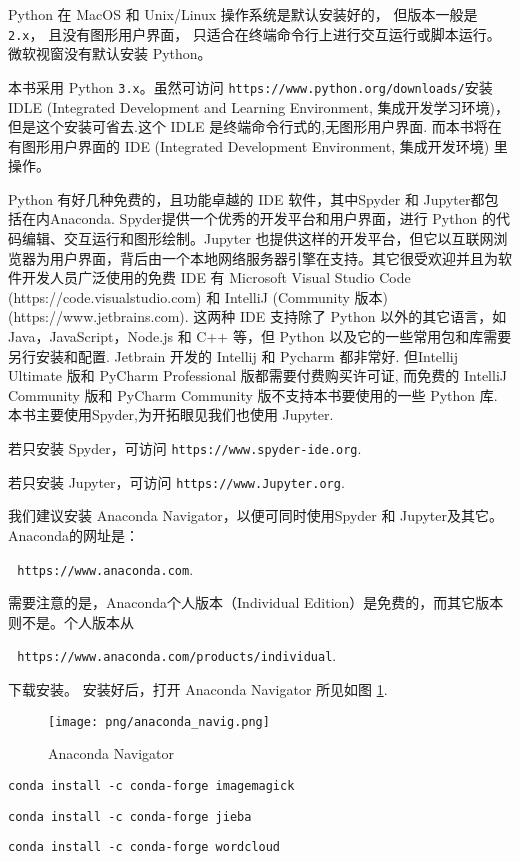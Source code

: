 \documentclass[main.tex]{subfiles}
\begin{document}
Python 在 MacOS 和 Unix/Linux 操作系统是默认安装好的，
但版本一般是 \texttt{2.x}，
且没有图形用户界面，
只适合在终端命令行上进行交互运行或脚本运行。
微软视窗没有默认安装 Python。

本书采用 Python \texttt{3.x}。虽然可访问 \texttt{https://www.python.org/downloads/}安装 IDLE (Integrated Development and Learning Environment, 集成开发学习环境)，但是这个安装可省去.这个 IDLE 是终端命令行式的,无图形用户界面.
而本书将在有图形用户界面的 IDE (Integrated Development Environment, 集成开发环境) 里操作。

Python 有好几种免费的，且功能卓越的 IDE 软件，其中Spyder 和 Jupyter都包括在内Anaconda. Spyder提供一个优秀的开发平台和用户界面，进行 Python 的代码编辑、交互运行和图形绘制。Jupyter 也提供这样的开发平台，但它以互联网浏览器为用户界面，背后由一个本地网络服务器引擎在支持。其它很受欢迎并且为软件开发人员广泛使用的免费 IDE 有 Microsoft Visual Studio Code (https://code.visualstudio.com) 和 IntelliJ (Community 版本)
 (https://www.jetbrains.com).
这两种 IDE 支持除了 Python 以外的其它语言，如 Java，JavaScript，Node.js 和 C++ 等，但 Python 以及它的一些常用包和库需要另行安装和配置. Jetbrain 开发的 Intellij 和 Pycharm 都非常好. 但Intellij Ultimate 版和 PyCharm Professional 版都需要付费购买许可证, 而免费的 IntelliJ Community 版和 PyCharm Community 版不支持本书要使用的一些 Python 库. 本书主要使用Spyder,为开拓眼见我们也使用 Jupyter.


若只安装 Spyder，可访问
\texttt{https://www.spyder-ide.org}.

若只安装 Jupyter，可访问
\texttt{https://www.Jupyter.org}.

我们建议安装 Anaconda Navigator，以便可同时使用Spyder 和 Jupyter及其它。 Anaconda的网址是：

\,\,\,\,\texttt{https://www.anaconda.com}.

\noindent 需要注意的是，Anaconda个人版本（Individual Edition）是免费的，而其它版本则不是。个人版本从

\,\,\,\,\texttt{https://www.anaconda.com/products/individual}.

\noindent 下载安装。
安装好后，打开 Anaconda Navigator 所见如图 \ref{fig:2.1.1}.

\begin{figure}[h]
	\texttt{[image: png/anaconda\_navig.png]}
	\caption{Anaconda Navigator}\label{fig:2.1.1}
\end{figure}


\texttt{conda install -c conda-forge imagemagick}

\texttt{conda install -c conda-forge jieba}

\texttt{conda install -c conda-forge wordcloud}
\end{document}
